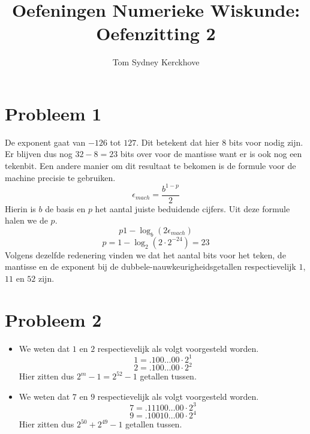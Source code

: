 \documentclass[12pt,a4paper]{article}
\author{Tom Sydney Kerckhove}
\title{Oefeningen Numerieke Wiskunde:\\ Oefenzitting 2}
\begin{document}
\maketitle

\section{Probleem 1}
De exponent gaat van $-126$ tot $127$. Dit betekent dat hier $8$ bits voor nodig zijn. Er blijven dus nog $32-8 = 23$ bits over voor de mantisse want er is ook nog een tekenbit.
Een andere manier om dit resultaat te bekomen is de formule voor de machine precisie te gebruiken.
\[
\epsilon_{mach} = \frac{b^{1-p}}{2}
\]
Hierin is $b$ de basis en $p$ het aantal juiste beduidende cijfers.
Uit deze formule halen we de $p$.
\[
p 1-\log_{b}(2\epsilon_{mach})
\]
\[
p = 1-\log_{2}(2\cdot 2^{-24}) = 23
\]
Volgens dezelfde redenering vinden we dat het aantal bits voor het teken, de mantisse en de exponent bij de dubbele-nauwkeurigheidsgetallen respectievelijk $1$, $11$ en $52$ zijn.

\section{Probleem 2}
\begin{itemize}
\item We weten dat $1$ en $2$ respectievelijk als volgt voorgesteld worden.
\[1 = .100\ldots00 \cdot 2^1\]
\[2 = .100\ldots00 \cdot 2^2\]
Hier zitten dus $2^m-1=2^{52}-1$ getallen tussen.
\item We weten dat $7$ en $9$ respectievelijk als volgt voorgesteld worden.
\[7 = .11100\ldots00 \cdot 2^3\]
\[9 = .10010\ldots00 \cdot 2^4\]
Hier zitten dus $2^{50}+2^{49}-1$ getallen tussen.
\end{itemize}
\end{document}
